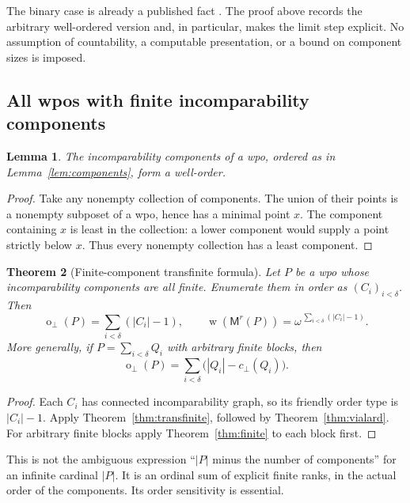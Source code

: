 \documentclass[11pt,a4paper]{article}
\newtheorem{theorem}{Theorem}[section]
\newtheorem{lemma}[theorem]{Lemma}
\theoremstyle{definition}
\theoremstyle{remark}
\newcommand{\fot}{\operatorname{o}_{\perp}}
\newcommand{\wid}{\operatorname{w}}
\newcommand{\cc}{c_{\perp}}
\newcommand{\Mr}{\mathsf{M}^{r}}
\begin{document}
The binary case is already a published fact
\cite[Theorem~5.4.8(1)]{vialard2024}. The proof above records the arbitrary
well-ordered version and, in particular, makes the limit step explicit.
No assumption of countability, a computable presentation, or a bound on
component sizes is imposed.

\subsection{All wpos with finite incomparability components}

\begin{lemma}
The incomparability components of a wpo, ordered as in
Lemma~\ref{lem:components}, form a well-order.
\end{lemma}

\begin{proof}
Take any nonempty collection of components. The union of their points is
a nonempty subposet of a wpo, hence has a minimal point $x$. The component
containing $x$ is least in the collection: a lower component would supply
a point strictly below $x$. Thus every nonempty collection has a least
component.
\end{proof}

\begin{theorem}[Finite-component transfinite formula]\label{thm:finitecomponents}
Let $P$ be a wpo whose incomparability components are all finite. Enumerate
them in order as $(C_i)_{i<\delta}$. Then
\begin{equation}\label{eq:finitecomponents}
 \boxed{\fot(P)=\sum_{i<\delta}(|C_i|-1),\qquad
 \wid(\Mr(P))=\omega^{\,\sum_{i<\delta}(|C_i|-1)}.}
\end{equation}
More generally, if $P=\sum_{i<\delta}Q_i$ with arbitrary finite blocks, then
\[
 \fot(P)=\sum_{i<\delta}\bigl(|Q_i|-\cc(Q_i)\bigr).
\]
\end{theorem}

\begin{proof}
Each $C_i$ has connected incomparability graph, so its friendly order type
is $|C_i|-1$. Apply Theorem~\ref{thm:transfinite}, followed by
Theorem~\ref{thm:vialard}. For arbitrary finite blocks apply
Theorem~\ref{thm:finite} to each block first.
\end{proof}

This is not the ambiguous expression ``$|P|$ minus the number of
components'' for an infinite cardinal $|P|$. It is an ordinal sum of
explicit finite ranks, in the actual order of the components. Its order
sensitivity is essential.
\end{document}
